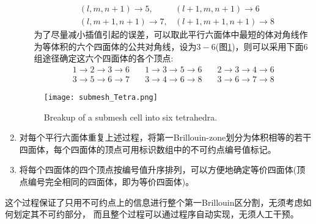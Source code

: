 \begin{enumerate}
\begin{itemize}
\begin{displaymath}
\begin{aligned}
		&(l,m,n+1)\rightarrow 5,&(l+1,m,n+1)\rightarrow 6\\
		&(l,m+1,n+1)\rightarrow 7,&(l+1,m+1,n+1)\rightarrow 8
	\end{aligned}
\end{displaymath}
为了尽量减小插值引起的误差，可以取此平行六面体中最短的体对角线作为等体积的六个四面体的公共对角线，设为$3-6$(图\ref{Fig:Submesh_Tetra})，则可以采用下面6组途径确定这六个四面体的各个顶点:~
\begin{displaymath}
	\begin{aligned}
		1\rightarrow2\rightarrow3\rightarrow6\quad&1\rightarrow3\rightarrow5\rightarrow6\quad&2\rightarrow3\rightarrow4\rightarrow6\\
		3\rightarrow5\rightarrow6\rightarrow7\quad&3\rightarrow4\rightarrow6\rightarrow8\quad&3\rightarrow6\rightarrow7\rightarrow8
	\end{aligned}
\end{displaymath}
		\end{itemize}
\begin{figure}[h!]
\centering
\vspace*{-0.28in}
\texttt{[image: submesh\_Tetra.png]}
\caption{\small Breakup of a submesh cell into six tetrahedra.}%
\label{Fig:Submesh_Tetra}
\end{figure}
	\item 对每个平行六面体重复上述过程，将第一\textrm{Brillouin-zone}划分为体积相等的若干四面体，每个四面体的顶点可用标识数组中的不可约点编号值标记。
	\item 将每个四面体的四个顶点按编号值升序排列，可以方便地确定等价四面体(顶点编号完全相同的四面体，即为等价四面体)。
\end{enumerate}

这个过程保证了只用不可约点上的信息进行整个第一\textrm{Brillouin}区分割，无须考虑如何划定其不可约部分，
而且整个过程可以通过程序自动实现，无须人工干预。

